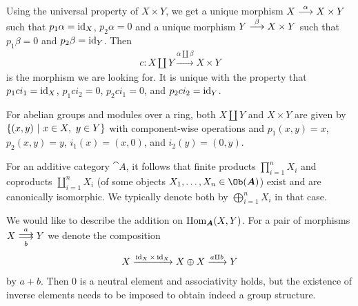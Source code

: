\documentclass[a4paper,parskip=half,numbers=enddot, DIV=12]{scrreprt}
\begin{document}
\begin{rem*}
\begin{alphanumerate}
	 	Using the universal property of $X\times Y$, we get a unique morphism $X\morphism[\alpha]X\times Y$ such that $p_1\alpha=\operatorname{id}_X$, $p_2\alpha=0$ and a unique morphism $Y\morphism[\beta]X\times Y$ such that $p_1\beta=0$ and $p_2\beta=\operatorname{id}_Y$. Then 
	 	\begin{align*}
	 		c\colon X\amalg Y\xrightarrow{\alpha\amalg\beta}X\times Y
	 	\end{align*}
	 	is the morphism we are looking for. It is unique with the property that $p_1 c i_1=\operatorname{id}_X$, $p_1 c i_2=0$, $p_2 c i_1=0$, and $p_2 c i_2=\operatorname{id}_Y$.
	 	\item For abelian groups and modules over a ring, both $X\amalg Y$ and $X\times Y$ are given by $\left\{(x,y)\ \middle|\  x\in X,\ y\in Y\right\}$ with component-wise operations and $p_1(x,y)=x$, $p_2(x,y)=y$, $i_1(x)=(x,0)$, and $i_2(y)=(0,y)$.
	 	\item For an additive category ${\cat A}$, it follows that finite products $\prod_{i=1}^nX_i$ and coproducts $\coprod_{i=1}^nX_i$ (of some objects $X_1,\ldots,X_n\in\Ob({\cat A})$) exist and are canonically isomorphic. We typically denote both by $\bigoplus_{i=1}^nX_i$ in that case.
	 	\item We would like to describe the addition on $\Hom_{\cat A}(X,Y)$. For a pair of morphisms $X\doublemorphism[a][b]Y$ we denote the composition
	 	\begin{align*}
	 		X\xrightarrow{\operatorname{id}_X\times\operatorname{id}_X}X\oplus X\xrightarrow{a\amalg b}Y
	 	\end{align*}
	 	by $a+b$. Then $0$ is a neutral element and associativity holds, but the existence of inverse elements needs to be imposed to obtain indeed a group structure.
	 	

\end{alphanumerate}
\end{rem*}
\end{document}
